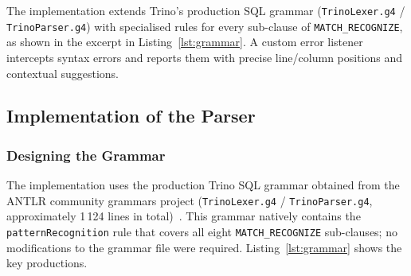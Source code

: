 The implementation extends Trino's production SQL grammar
(\texttt{TrinoLexer.g4} / \texttt{TrinoParser.g4}) with specialised
rules for every sub-clause of \texttt{MATCH\_RECOGNIZE}, as shown in
the excerpt in Listing~\ref{lst:grammar}.  A custom error listener
intercepts syntax errors and reports them with precise
line/column positions and contextual suggestions.

\subsection{Implementation of the Parser}
\label{subsec:meth-parser-impl}

\subsubsection{Designing the Grammar}
\label{subsubsec:meth-grammar-design}

The implementation uses the production Trino SQL grammar obtained
from the ANTLR community grammars project
(\texttt{TrinoLexer.g4} / \texttt{TrinoParser.g4},
approximately 1\,124 lines in total)~\cite{antlr_trino_sql}.
This grammar natively contains the \texttt{patternRecognition} rule
that covers all eight \texttt{MATCH\_RECOGNIZE} sub-clauses; no
modifications to the grammar file were required.
Listing~\ref{lst:grammar} shows the key productions.

